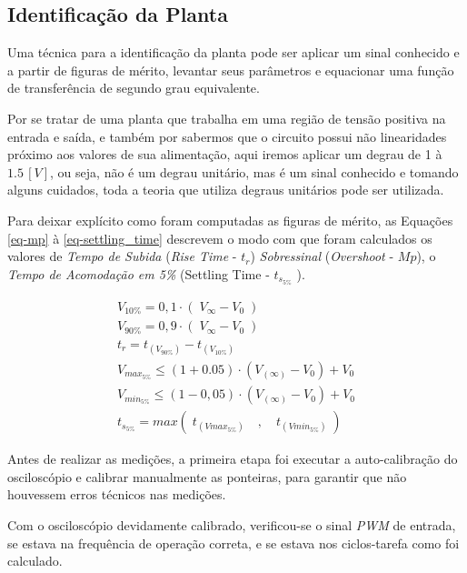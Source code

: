 \documentclass[
	12pt,				%
	article,			%
	openright,			%
	oneside,
	a4paper,			%
	chapter=TITLE,		%
	section=TITLE,		%
	english,			%
	french,				%
	spanish,			%
	brazil,				%
]{abntex2}
\begin{document}
    	\subsection{Identificação da Planta}
    	
        	Uma técnica para a identificação da planta pode ser aplicar um sinal conhecido e a partir de figuras de mérito, levantar seus parâmetros e equacionar uma função de transferência de segundo grau equivalente.
        	
        	Por se tratar de uma planta que trabalha em uma região de tensão positiva na entrada e saída, e também por sabermos que o circuito possui não linearidades próximo aos valores de sua alimentação, aqui iremos aplicar um degrau de 1 à $1.5\,[V]$, ou seja, não é um degrau unitário, mas é um sinal conhecido e tomando alguns cuidados, toda a teoria que utiliza degraus unitários pode ser utilizada.
        	
        	Para deixar explícito como foram computadas as figuras de mérito, as Equações \ref{eq-mp} à \ref{eq-settling_time} descrevem o modo com que foram calculados os valores de \textit{Tempo de Subida} (\textit{Rise Time} - $t_r$) \textit{Sobressinal} (\textit{Overshoot} - $Mp$), o \textit{Tempo de Acomodação em 5\%} (Settling Time - $t_{s_{5\%}}$ ).
        	
        	\begin{eqnarray}
        		\nonumber
        		V_{10\%} = 0,1\cdot(\;V_{\infty} -V_{0}\;) \\
        		\nonumber
        		V_{90\%} = 0,9\cdot(\;V_{\infty} -V_{0}\;) \\
        		\label{eq-mp}
        		t_{r} = t_{(V_{90\%})} - t_{(V_{10\%})} \\
        		\nonumber
        		V_{max_{5\%}} \leq (1 +0.05) \cdot (V_{(\infty)} - V_{0}) +V_{0} \\
        		\nonumber
        		V_{min_{5\%}} \leq (1 -0,05) \cdot (V_{(\infty)} - V_{0}) +V_{0} \\
        		\label{eq-settling_time}
        		t_{s_{5\%}} = max\left(\; t_{(Vmax_{5\%})}\quad, \quad t_{(Vmin_{5\%})}\;\right)		
        	\end{eqnarray}
        	
        	Antes de realizar as medições, a primeira etapa foi executar a auto-calibração do osciloscópio e calibrar manualmente as ponteiras, para garantir que não houvessem erros técnicos nas medições.
        	
        	Com o osciloscópio devidamente calibrado, verificou-se o sinal \textit{PWM} de entrada, se estava na frequência de operação correta, e se estava nos ciclos-tarefa como foi calculado. 
        	
\end{document}
